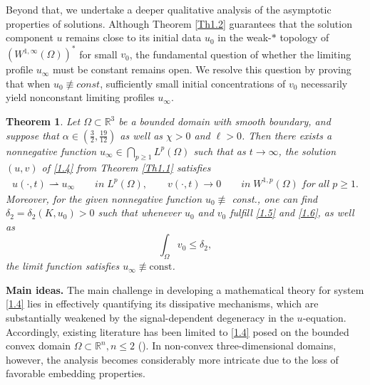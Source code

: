 \documentclass[12pt]{article}
\theoremstyle{plain}
\newtheorem{theorem}{Theorem}[section]
\theoremstyle{definition}
\numberwithin{equation}{section}
\begin{document}
Beyond that, we undertake a deeper qualitative analysis of the asymptotic properties of solutions.
Although Theorem \ref{Th1.2} guarantees that the solution component $u$ remains close to its initial data $u_0$ in the weak-$\ast$ topology of $(W^{1,\infty}(\Omega))^*$ for small $v_0$,  the fundamental question of whether the limiting profile  $u_\infty$  must be constant remains open.  We resolve this question by proving that when $u_0\not\equiv const$, sufficiently small initial concentrations of $v_0$  necessarily yield  nonconstant limiting profiles
 $u_\infty$.
\begin{theorem}\label{Th1.3}
Let $\Omega \subset \mathbb R^3$ be a bounded domain with smooth boundary, and suppose that $\alpha \in \left( \frac{3}{2}, \frac{19}{12} \right)$ as well as
$\chi >0$ and $\ell>0$. Then  there exists a nonnegative function $u_{\infty}\in \bigcap_{p\geq1}L^p(\Omega)$ such that as $t\to \infty$, the solution $(u,v)$ of \eqref{1.4} from Theorem \ref{Th1.1} satisfies
\begin{align}\label{1.10-1}
    u(\cdot,t)\rightharpoonup u_{\infty}\qquad in\;L^p(\Omega),\qquad v(\cdot,t)\rightarrow 0\qquad in\;W^{1,p}(\Omega)\; for \;all\; p\geq 1.
\end{align}
Moreover, for the given nonnegative function $u_0\not\equiv$ const., one can find
  $\delta_2=\delta_2(K, u_0)>0$ such that whenever $u_0$ and $v_0$ fulfill
\eqref{1.5} and \eqref{1.6}, as well as
$$\int_{\Omega}v_0\leq \delta_2,$$
the limit function satisfies
 $ u_{\infty}\not\equiv\mathrm{const}$.
\end{theorem}





\textbf{Main ideas.} The main challenge  in developing a mathematical theory for system
 \eqref{1.4} lies in effectively quantifying its dissipative mechanisms,  which
  are substantially weakened by the signal-dependent degeneracy in  the $u$-equation.
  Accordingly, existing literature has been limited to \eqref{1.4} posed on the bounded convex
 domain
 $\Omega \subset\mathbb{R}^n, n\leq 2$
  (\cite{Winkler3,WNARWA,WJDE,WCVPDE,LiWinkler1,LiG}). In non-convex three-dimensional domains, however, the analysis becomes considerably more intricate due to the loss of favorable embedding properties.
\end{document}
